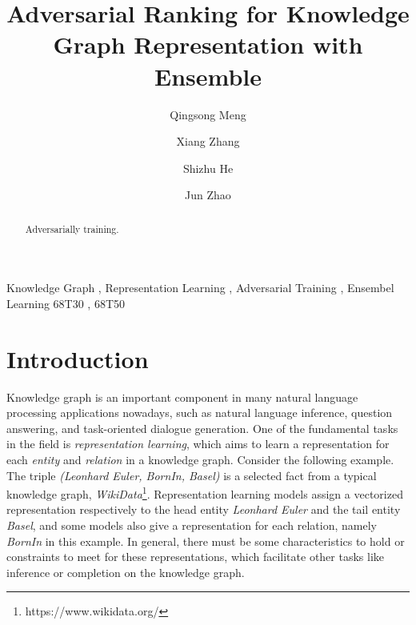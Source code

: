 \documentclass[twocolumn,a4paper,10pt,review,3p]{elsarticle}
\begin{document}

\begin{frontmatter}

\title{Adversarial Ranking for Knowledge Graph Representation with Ensemble}


\author[hrbaddress]{Qingsong Meng}

\author[ucasaddress,hrbaddress]{Xiang Zhang}

\author[ucasaddress]{Shizhu He}

\author[ucasaddress]{Jun Zhao}

\address[hrbaddress]{Harbin University of Science and Technology, No.52 Xuefu Road, Nangang District, Harbin, 150080, China}
\address[ucasaddress]{University of Chinese Academy of Sciences, No.19(A) Yuquan Road, Shijingshan District, Beijing, P.R.China 100049}


\begin{abstract}
Adversarially training.
\end{abstract}

\begin{keyword}
Knowledge Graph \sep{} Representation Learning \sep{} Adversarial Training \sep{} Ensembel Learning
\MSC[2010] 68T30 \sep{} 68T50
\end{keyword}

\end{frontmatter}


\linenumbers{}


\section{Introduction}
\label{sec:intro}

Knowledge graph is an important component in many natural language processing applications nowadays, such as natural language inference, question answering, and task-oriented dialogue generation. One of the fundamental tasks in the field is \emph{representation learning}, which aims to learn a representation for each \emph{entity} and \emph{relation} in a knowledge graph. Consider the following example. The triple \emph{(Leonhard Euler, BornIn, Basel)} is a selected fact from a typical knowledge graph, \emph{WikiData}\footnote{https://www.wikidata.org/}. Representation learning models assign a vectorized representation respectively to the head entity \emph{Leonhard Euler} and the tail entity \emph{Basel}, and some models also give a representation for each relation, namely \emph{BornIn} in this example. In general, there must be some characteristics to hold or constraints to meet for these representations, which facilitate other tasks like inference or completion on the knowledge graph.
\end{document}
